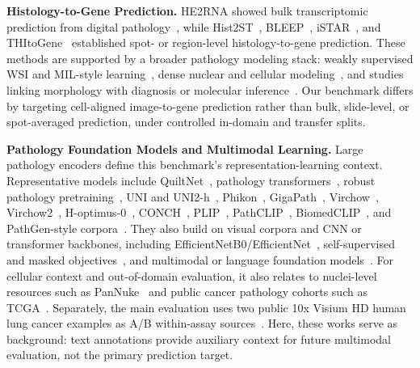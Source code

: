 \documentclass[sigconf,review]{acmart}
\begin{document}
\noindent\textbf{Histology-to-Gene Prediction.}
HE2RNA showed bulk transcriptomic prediction from digital pathology~\cite{pronier2020he2rna}, while Hist2ST~\cite{zeng2022spatial}, BLEEP~\cite{xie2023spatially}, iSTAR~\cite{zhang2024inferring}, and THItoGene~\cite{jia2024thitogene} established spot- or region-level histology-to-gene prediction. These methods are supported by a broader pathology modeling stack: weakly supervised WSI and MIL-style learning~\cite{campanella2019clinical,lu2021data,shao2021transmil,ciga2022self,ilse2018attention}, dense nuclear and cellular modeling~\cite{ronneberger2015unet,graham2019hover,horst2024cellvit}, and studies linking morphology with diagnosis or molecular inference~\cite{bejnordi2017diagnostic,wang2016deep,komura2018machine,kather2019deep}. Our benchmark differs by targeting cell-aligned image-to-gene prediction rather than bulk, slide-level, or spot-averaged prediction, under controlled in-domain and transfer splits.

\noindent\textbf{Pathology Foundation Models and Multimodal Learning.}
Large pathology encoders define this benchmark's representation-learning context. Representative models include QuiltNet~\cite{ikezogwo2023quilt1m}, pathology transformers~\cite{wang2022transformer}, robust pathology pretraining~\cite{azizi2023robust}, UNI and UNI2-h~\cite{chen2024uni,mahmoodlab_uni2h}, Phikon~\cite{filiot2024phikon}, GigaPath~\cite{xu2024whole}, Virchow~\cite{vorontsov2023virchow}, Virchow2~\cite{zimmermann2024virchow2}, H-optimus-0~\cite{hoptimus0}, CONCH~\cite{lu2024visual}, PLIP~\cite{huang2023visual}, PathCLIP~\cite{he2024pathclip}, BiomedCLIP~\cite{zhang2023biomedclip}, and PathGen-style corpora~\cite{sun2024pathgen}. They also build on visual corpora and CNN or transformer backbones, including EfficientNetB0/EfficientNet~\cite{deng2009imagenet,lin2014microsoft,he2016deep,koonce2021resnet,simonyan2015very,szegedy2015going,tan2019efficientnet,dosovitskiy2021image,touvron2021training,liu2021swin,liu2022convnet}, self-supervised and masked objectives~\cite{he2020momentum,chen2020simple,grill2020bootstrap,zbontar2021barlow,caron2018deep,caron2020unsupervised,chen2021exploring,caron2021emerging,oquab2023dinov2,he2022masked,baevski2022data2vec}, and multimodal or language foundation models~\cite{radford2021learning,devlin2019bert,raffel2020exploring,achiam2023gpt4,bommasani2021opportunities,koh2021wilds}. For cellular context and out-of-domain evaluation, it also relates to nuclei-level resources such as PanNuke~\cite{gamper2020pannuke} and public cancer pathology cohorts such as TCGA~\cite{weinstein2013cancer}. Separately, the main evaluation uses two public 10x Visium HD human lung cancer examples as A/B within-assay sources~\cite{tenx_visium_hd_postx_lung_ffpe,tenx_visium_hd_lung_fixed_frozen}. Here, these works serve as background: text annotations provide auxiliary context for future multimodal evaluation, not the primary prediction target.
\end{document}
